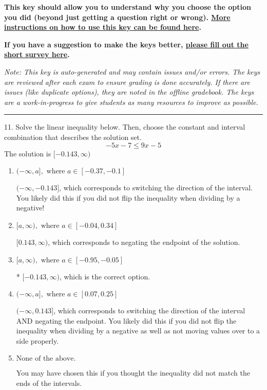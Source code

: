 \documentclass{article}[14pt]
\begin{document}
\textbf{This key should allow you to understand why you choose the option you did (beyond just getting a question right or wrong). \href{https://xronos.clas.ufl.edu/mac1105spring2020/courseDescriptionAndMisc/Exams/LearningFromResults}{More instructions on how to use this key can be found here}.}

\textbf{If you have a suggestion to make the keys better, \href{https://forms.gle/CZkbZmPbC9XALEE88}{please fill out the short survey here}.}

\textit{Note: This key is auto-generated and may contain issues and/or errors. The keys are reviewed after each exam to ensure grading is done accurately. If there are issues (like duplicate options), they are noted in the offline gradebook. The keys are a work-in-progress to give students as many resources to improve as possible.}

\rule{\textwidth}{0.4pt}

11. Solve the linear inequality below. Then, choose the constant and interval combination that describes the solution set.
$$ -5x -7 \leq 9x -5 $$ 
The solution is $ [-0.143, \infty) $ 

\begin{enumerate}[label=\Alph*.] 
\item $ (-\infty, a], \text{ where } a \in [-0.37, -0.1] $ 

  $(-\infty, -0.143]$, which corresponds to switching the direction of the interval. You likely did this if you did not flip the inequality when dividing by a negative! 
\item $ [a, \infty), \text{ where } a \in [-0.04, 0.34] $ 

  $[0.143, \infty)$, which corresponds to negating the endpoint of the solution. 
\item $ [a, \infty), \text{ where } a \in [-0.95, -0.05] $ 

 * $[-0.143, \infty)$, which is the correct option. 
\item $ (-\infty, a], \text{ where } a \in [0.07, 0.25] $ 

  $(-\infty, 0.143]$, which corresponds to switching the direction of the interval AND negating the endpoint. You likely did this if you did not flip the inequality when dividing by a negative as well as not moving values over to a side properly. 
\item $ \text{None of the above}. $ 

 You may have chosen this if you thought the inequality did not match the ends of the intervals. 
\end{enumerate} 
 
\end{document}

